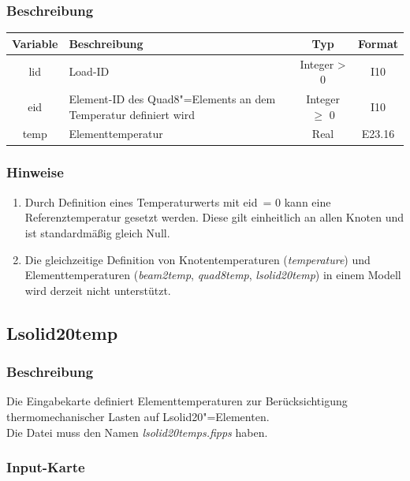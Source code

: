 \documentclass[11pt,titlepage,listof=totoc,bibliography=totoc,twoside]{scrreprt}
\begin{document}
{{\subsubsection{Beschreibung}

\begin{tabularx}{\textwidth}{cXcc}
\toprule
Variable  & Beschreibung  & Typ          & Format  \\
\midrule
lid       & Load-ID       & Integer > 0  & I10     \\
eid       & Element-ID des Quad8"=Elements an dem Temperatur definiert wird & Integer $\geq$ 0 & I10  \\
temp      & Elementtemperatur & Real      & E23.16  \\
\bottomrule
\end{tabularx}

\subsubsection{Hinweise}

\begin{enumerate}
 \item Durch Definition eines Temperaturwerts mit eid~= 0 kann eine Referenztemperatur gesetzt werden. Diese gilt einheitlich an allen Knoten und ist standardmäßig gleich Null.
 \item Die gleichzeitige Definition von Knotentemperaturen (\emph{temperature}) und Elementtemperaturen (\emph{beam2temp}, \emph{quad8temp}, \emph{lsolid20temp}) in einem Modell wird derzeit nicht unterstützt.
\end{enumerate}

\newpage

\subsection{Lsolid20temp}

\subsubsection{Beschreibung}

Die Eingabekarte definiert Elementtemperaturen zur Berücksichtigung thermomechanischer Lasten auf Lsolid20"=Elementen.\\
Die Datei muss den Namen \emph{lsolid20temps.fipps} haben.

\subsubsection{Input-Karte}

}}
\end{document}
